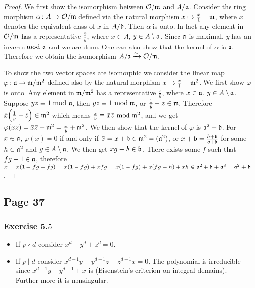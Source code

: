 \documentclass{note}
\newcommand{\Page}[1]{\subsection*{Page #1}}
\newcommand{\Ex}[1]{\subsubsection*{Exercise #1}}
\newcommand{\divides}{\mid}
\newcommand{\ndivide}{\nmid}
\begin{document}
\begin{proof}
  We first show the isomorphism between $\mathcal{O}/\mathfrak{m}$ and
  $A/\mathfrak{a}$. Consider the ring morphism
  $\alpha\colon A \to \mathcal{O}/\mathfrak{m}$ defined via the natural
  morphism $x \mapsto \frac{\bar{x}}{1}+\mathfrak{m}$, where $\bar{x}$
  denotes the equivalent class of $x$ in $A/\mathfrak{b}$. Then $\alpha$
  is onto. In fact any element in $\mathcal{O}/\mathfrak{m}$ has a
  representative $\frac{\bar{x}}{\bar{y}}$, where $x\in A$,
  $y \in A\setminus\mathfrak{a}$. Since $\mathfrak{a}$ is maximal, $y$ has
  an inverse $\!\mathop{}\mathrm{mod}\ \mathfrak{a}$ and we are done. One can also show
  that the kernel of $\alpha$ is $\mathfrak{a}$. Therefore we obtain the
  isomorphism $A/\mathfrak{a} \xrightarrow{\sim} \mathcal{O}/\mathfrak{m}$.

  To show the two vector spaces are isomorphic we consider the linear
  map $\varphi\colon \mathfrak{a} \to \mathfrak{m}/\mathfrak{m}^2$ defined also
  by the natural morphism $x\mapsto\frac{\bar{x}}{1}+\mathfrak{m}^2$. We
  first show $\varphi$ is onto. Any element in $\mathfrak{m}/\mathfrak{m}^2$
  has a representative $\frac{\bar{x}}{\bar{y}}$, where
  $x \in \mathfrak{a}$, $y \in A\setminus\mathfrak{a}$. Suppose
  $yz \equiv 1 \mathop{}\mathrm{mod}\  \mathfrak{a}$, then
  $\bar{y}\bar{z} \equiv 1 \mathop{}\mathrm{mod}\  \mathfrak{m}$, or
  $\frac{1}{\bar{y}}-\bar{z} \in \mathfrak{m}$. Therefore
  $\bar{x}\left(\frac{1}{\bar{y}}-\bar{z}\right) \in \ideal{m}^2$
  which means
  $\frac{\bar{x}}{\bar{y}} \equiv \bar{x}\bar{z} \mathop{}\mathrm{mod}\  \mathfrak{m}^2$,
  and we get
  $\varphi(xz) = \bar{x}\bar{z}+\mathfrak{m}^2 =
  \frac{\bar{x}}{\bar{y}}+\mathfrak{m}^2$. We then show that the kernel
  of $\varphi$ is $\mathfrak{a}^2+\mathfrak{b}$. For $x \in \mathfrak{a}$,
  $\varphi(x) = 0$ if and only if
  $\bar{x} = x+\mathfrak{b} \in \mathfrak{m}^2 = (\mathfrak{a}^2)$, or
  $x+\mathfrak{b} = \frac{h+\mathfrak{b}}{g+\mathfrak{b}}$ for some
  $h\in\mathfrak{a}^2$ and $g\in A\setminus\mathfrak{a}$. We then get
  $xg - h \in \mathfrak{b}$. There exists some $f$ such that
  $fg-1\in \mathfrak{a}$, therefore
  $x = x(1-fg+fg) = x(1-fg) + xfg = x(1-fg) + x(fg - h) + xh \in
  \mathfrak{a}^2 + \mathfrak{b} + \mathfrak{a}^3 = \mathfrak{a}^2+\mathfrak{b}$.
\end{proof}

\Page{37}
\Ex{5.5}
\begin{itemize}
\item If $p\ndivide d$ consider $x^d + y^d + z^d = 0$.
\item If $p\divides d$ consider $x^{d-1}y + y^{d-1}z + z^{d-1}x =
  0$. The polynomial is irreducible since $x^{d-1}y + y^{d-1} + x$ is
  (Eisenstein's criterion on integral domains). Further more it is
  nonsingular.
\end{itemize}
\end{document}
